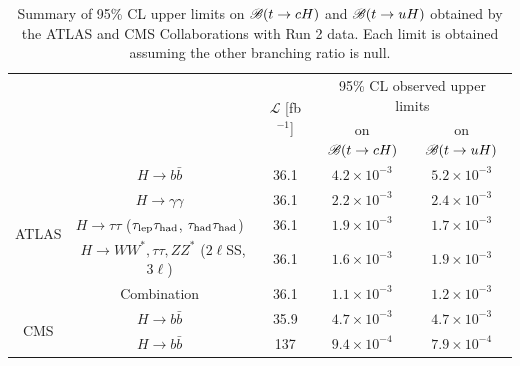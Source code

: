 \documentclass[PAPER, coverpage, atlasdraft=true, texlive=2016, UKenglish]{\ATLASLATEXPATH atlasdoc}
\providecommand{\DIFaddbeginFL}{} %
\providecommand{\DIFaddendFL}{} %
\providecommand{\DIFdelbeginFL}{} %
\providecommand{\DIFdelendFL}{} %
\begin{document}
\begin{table}[t!]
\caption{\DIFdelbeginFL %
\DIFdelendFL \DIFaddbeginFL \small{Summary of 95\% CL upper limits on $\mathscr{B}(t \to cH)$ and $\mathscr{B}(t \to uH)$ obtained by the ATLAS and CMS Collaborations with Run 2 data. Each limit is obtained assuming the other branching ratio is null.}\DIFaddendFL }
\begin{center}
\small 
\begin{tabular}{ccccc}
\toprule\toprule
& &\multirow{2}{*}{$\mathcal{L}$ [fb$^{-1}$]} & \multicolumn{2}{c}{95\% CL observed upper limits}  \\
& & 										    & \multicolumn{1}{c}{on $\mathscr{B}(t \to cH)$}            & \multicolumn{1}{c}{on $\mathscr{B}(t \to uH)$} \\
\midrule
\multirow{5}{*}{ATLAS}
& $H \to b\bar{b}$~\cite{fcnc36}                                          & 36.1         & $4.2 \times 10^{-3}$ & $5.2 \times 10^{-3}$ \\
& $H \to \gamma\gamma$~\cite{Aaboud:2017mfd}                              & 36.1         & $2.2 \times 10^{-3}$  & $2.4 \times 10^{-3}$  \\
& $H \to \tau\tau$ ($\tau_{\mathrm{lep}} \tau_{\mathrm{had}}$, $\tau_{\mathrm{had}} \tau_{\mathrm{had}}$)~\cite{fcnc36}                   & 36.1         & $1.9 \times 10^{-3}$  & $1.7 \times 10^{-3}$  \\ 
& $H \to WW^*, \tau\tau, ZZ^*$ ($2\ell$SS, $3\ell$)~\cite{Aaboud:2018pob} & 36.1         & $1.6 \times 10^{-3}$  & $1.9 \times 10^{-3}$\\ 
& Combination~\cite{fcnc36}                                               & 36.1         & $1.1 \times 10^{-3}$  & $1.2 \times 10^{-3}$  \\\midrule
\multirow{2}{*}{CMS} 
& $H \to b\bar{b}$~\cite{Sirunyan:2017uae}                                & 35.9         & $4.7 \times 10^{-3}$  & $4.7 \times 10^{-3}$  \\
& $H \to b\bar{b}$~\cite{CMS:2021gfa}                                     & 137          & $9.4 \times 10^{-4}$  & $7.9 \times 10^{-4}$  \\
% 
\bottomrule\bottomrule
\end{tabular}
\label{tab:limits_summary_ref}
\end{center}
\end{table}
\end{document}
